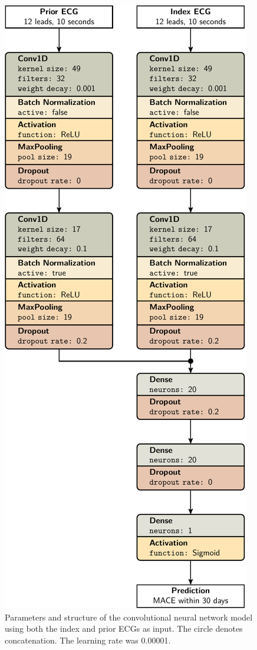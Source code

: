 \documentclass[preprint]{elsarticle}
\begin{document}
\begin{figure}[H]
\centering
\includegraphics[scale=\modelscale,keepaspectratio,trim=0 0 -16em 0]{figures/model-cnn2.pdf}
\caption{Parameters and structure of the convolutional neural network model using both the index and prior ECGs as input. The circle denotes concatenation. The learning rate was 0.00001.}
\end{figure}
\end{document}
